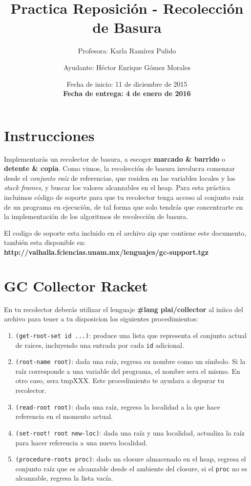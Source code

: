 \documentclass{article}
\author{Profesora: Karla Ramírez Pulido \and
  Ayudante: Héctor Enrique Gómez Morales}
\title{Practica Reposición - Recolección de Basura}
\date{Fecha de inicio: 11 de diciembre de 2015\\
  \textbf{Fecha de entrega: 4 de enero de 2016}}
\begin{document}
\maketitle
\section{Instrucciones}
Implementarás un recolector de basura, a escoger \textbf{marcado & barrido} o \textbf{detente & copia}.
Como vimos, la recolección de basura involucra comenzar desde el \textit{conjunto raíz} de referencias,
que residen en las variables locales y los \textit{stack frames}, y buscar los valores alcanzables en el heap.
Para esta práctica incluimos código de soporte para que tu recolector tenga acceso al conjunto raiz de un
programa en ejecución, de tal forma que solo tendrás que concentrarte en la implementación de los algoritmos de
recolección de basura.

El codigo de soporte esta incluido en el archivo zip que contiene este documento, también esta disponible
en: \textbf{http://valhalla.fciencias.unam.mx/lenguajes/gc-support.tgz}

\section*{GC Collector Racket}
En tu recolector deberás utilizar el lenguaje \textbf{#lang plai/collector} al iniico del archivo
para tener a tu disposicion los siguientes procedimientos:

\begin{enumerate}
\item \verb;(get-root-set id ...);: produce una lista que representa el conjunto actual de raices, incluyendo
  una entrada por cada \verb;id; adicional.
\item \verb;(root-name root);: dada una raíz, regresa su nombre como un símbolo. Si la raíz corresponde a una
  variable del programa, el nombre sera el mismo. En otro caso, sera tmpXXX. Este procedimiento te ayudara a
  depurar tu recolector.
\item \verb;(read-root root);: dada una raíz, regresa la localidad a la que hace referencia en el momento
  actual.
\item \verb;(set-root! root new-loc);: dada una raíz y una localidad, actualiza la raíz para hacer referencia
  a una nueva localidad.
\item \verb;(procedure-roots proc);: dado un closure almacenado en el heap, regresa el conjunto raíz que es
  alcanzable desde el ambiente del closure, si el \verb;proc; no es alcanzable, regresa la lista vacía.
\end{enumerate}
\end{document}
